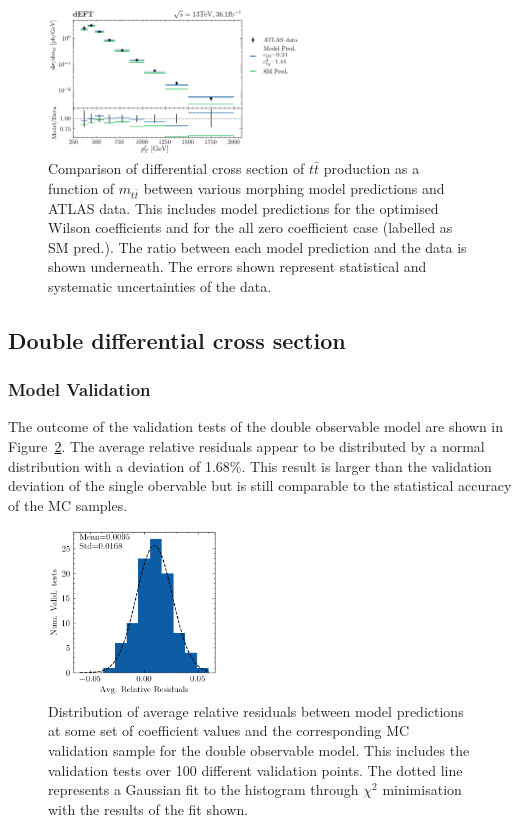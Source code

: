 \documentclass[a4paper,11pt]{article}
\begin{document}
\begin{figure}[htb]
    \centering
    \includegraphics[width=0.6\textwidth]{plots/ATLAS_model_result_1D_2OP.png}
    \caption{Comparison of differential cross section of $t\bar{t}$ production as a function of $m_{t\bar{t}}$ between various morphing model predictions and ATLAS data. This includes model predictions for the optimised Wilson coefficients and for the all zero coefficient case (labelled as SM pred.). The ratio between each model prediction and the data is shown underneath. The errors shown represent statistical and systematic uncertainties of the data.}
    \label{fig:model_result_1D_2OP}
\end{figure}


\subsection{Double differential cross section}
\subsubsection{Model Validation}
The outcome of the validation tests of the double observable model are shown in Figure~\ref{fig:residuals_hist_2D}.
The average relative residuals appear to be distributed by a normal distribution with a deviation of 1.68\%.
This result is larger than the validation deviation of the single obervable but is still comparable to the statistical accuracy of the MC samples.


\begin{figure}[htb]
    \centering
    \includegraphics[width=0.4\textwidth]{plots/residuals_hist_2D.png}
    \caption{Distribution of average relative residuals between model predictions at some set of coefficient values and the corresponding MC validation sample for the double observable model. This includes the validation tests over 100 different validation points. The dotted line represents a Gaussian fit to the histogram through $\chi^2$ minimisation with the results of the fit shown.}
    \label{fig:residuals_hist_2D}
\end{figure}
\end{document}
